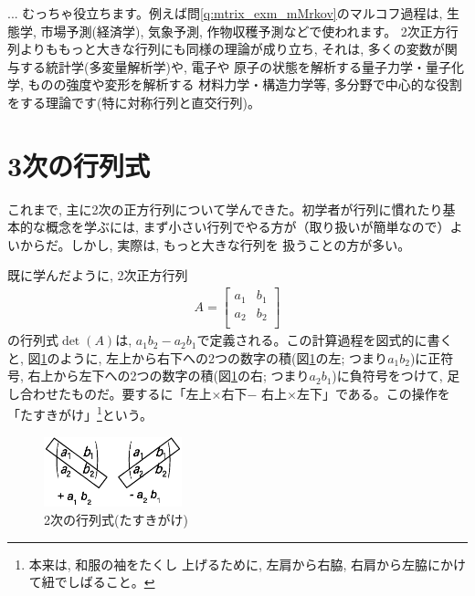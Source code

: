 \begin{faq}{\small{} 
... むっちゃ役立ちます。例えば問\ref{q:mtrix_exm_mMrkov}のマルコフ過程は, 
生態学, 市場予測(経済学), 気象予測, 作物収穫予測などで使われます。
2次正方行列よりももっと大きな行列にも同様の理論が成り立ち, 
それは, 多くの変数が関与する統計学(多変量解析学)や, 電子や
原子の状態を解析する量子力学・量子化学, ものの強度や変形を解析する
材料力学・構造力学等, 多分野で中心的な役割をする理論です(特に対称行列と直交行列)。}\end{faq}
\hv

\section{3次の行列式}\label{sec:2Ddet}

これまで, 主に2次の正方行列について学んできた。初学者が行列に慣れたり基本的な概念を学ぶには, 
まず小さい行列でやる方が（取り扱いが簡単なので）よいからだ。しかし, 実際は, もっと大きな行列を
扱うことの方が多い。

既に学んだように, 2次正方行列
\begin{eqnarray}
A=\begin{bmatrix}a_1 & b_1\\
a_2 & b_2\\
\end{bmatrix}
\end{eqnarray}
の行列式$\det (A)$は, $a_1b_2-a_2b_1$で定義される。この計算過程を図式的に書くと, 
図\ref{fig:Sarrus2D}のように, 左上から右下への2つの数字の積(図\ref{fig:Sarrus2D}の左; 
つまり$a_1b_2$)に正符号, 右上から左下への2つの数字の積(図\ref{fig:Sarrus2D}の右; 
つまり$a_2b_1$)に負符号をつけて, 足し合わせたものだ。要するに「左上×右下$-$
右上×左下」である。この操作を「たすきがけ」\footnote{本来は, 和服の袖をたくし
上げるために, 左肩から右脇, 右肩から左脇にかけて紐でしばること。}という。
\begin{figure}[h]
    \centering
    \includegraphics[width=4cm]{Sarrus2D.eps}
    \caption{2次の行列式(たすきがけ)}\label{fig:Sarrus2D}    
\end{figure}

